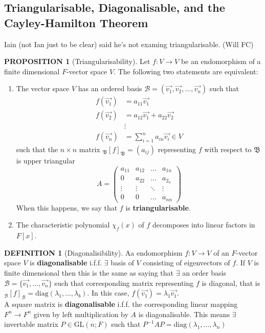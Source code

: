 \documentclass[12pt]{article}
\theoremstyle{definition}
\newtheorem{definition}{DEFINITION}[subsection]
\newtheorem{prop}{PROPOSITION}[subsection]
\begin{document}
\subsection{Triangularisable, Diagonalisable, and the Cayley-Hamilton Theorem}
Iain (not Ian just to be clear) said he's not examing triangularisable. (Will FC)

\begin{prop}[Triangularisability]
    Let $f:V\rightarrow V$ be an endomorphism of a finite dimensional $F$-vector space $V$. The following two statements are equivalent:
    \begin{enumerate}
        \item The vector space $V$ has an ordered basis $\mathcal{B} = (\vec{v_1},\vec{v_2},...,\vec{v_n})$ such that
                \[\begin{split}
                    f(\vec{v_1}) &= a_{11}\vec{v_1}\\
                    f(\vec{v_2}) &= a_{12}\vec{v_1} + a_{22}\vec{v_2}\\
                    &\vdots\\
                    f(\vec{v_n}) &= \sum_{i=1}^n a_{in}\vec{v_i} \in V
                \end{split}\]
                such that the $n \times n$ matrix $_\mathfrak{B}[f]_\mathfrak{B} = (a_{ij})$ representing $f$ with respect to $\mathfrak{B}$ is upper triangular
                $$A = \begin{pmatrix}
                    a_{11} & a_{12} & \hdots & a_{1n}\\
                    0 & a_{22} & \hdots & a_{2_n}\\
                    \vdots & \vdots & \ddots & \vdots\\
                    0 & 0 & \hdots & a_{nn}
                \end{pmatrix}$$
                When this happens, we say that $f$ is \textbf{triangularisable}.
        \item The characteristic polynomial $\chi_f(x)$ of $f$ decomposes into linear factors in $F[x]$.
    \end{enumerate}
\end{prop}

\begin{definition}[Diagonalisibility]
    Aa endomorphism $f:V \rightarrow V$ of an $F$-vector space $V$ is \textbf{diagonalisable} i.f.f. $\exists$ basis of $V$ consisting of eigenvectors of $f$. If $V$ is finite dimensional then this is the same as saying that $\exists$ an order basis $\mathcal{B} = \{\vec{v_1}, ..., \vec{v_n}\}$ such that corresponding matrix representing $f$ is diagonal, that is $_\mathcal{B}[f]_\mathcal{B} = \text{diag}(\lambda_1,...,\lambda_b)$. In this case, $f(\vec{v_1}) = \lambda_1\vec{v_1}$.\\
    A square matrix is \textbf{diagonalisable} i.f.f. the corresponding linear mapping $F^n \rightarrow F^n$ given by left multiplication by $A$ is diagonalisable. This means $\exists$ invertable matrix $P\in \text{GL}(n;F)$ such that $P^{-1}AP = \text{diag}(\lambda_1, ...,\lambda_n)$
\end{definition}
\end{document}
